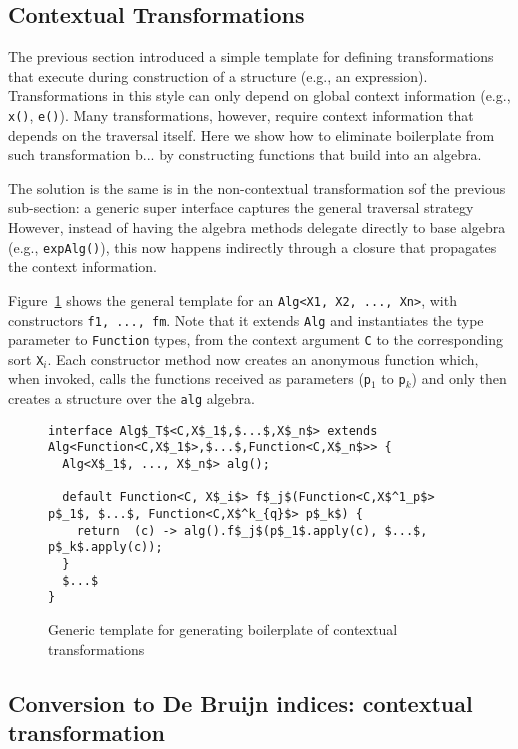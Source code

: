 \subsection{Contextual Transformations}\label{sec:contexttrans}

The previous section introduced a simple template for defining transformations that execute during construction of a structure (e.g., an expression).
Transformations in this style can only depend on global context information (e.g., \lstinline{x()}, \lstinline{e()}).
Many transformations, however, require context information that depends on the traversal itself.
Here we show how to eliminate boilerplate from such transformation b...  by constructing functions that build into an algebra.

The solution is the same is in the non-contextual transformation sof the previous sub-section: a generic super interface captures the general traversal strategy
However, instead of having the algebra methods delegate directly to base algebra (e.g., \lstinline{expAlg()}), this now happens indirectly through a closure that propagates the context information.

Figure~\ref{ctxTrafoTemplate} shows the general template for an \lstinline{Alg<X1, X2, ..., Xn>}, with constructors \lstinline{f1, ..., fm}.
Note that it extends \lstinline{Alg} and instantiates the type parameter to \lstinline{Function} types, from the context argument \lstinline{C} to the corresponding sort \lstinline{X}$_i$. 
Each constructor method now creates an anonymous function which, when invoked, calls the functions received as parameters (\lstinline{p}$_1$ to \lstinline{p}$_k$) and only then creates a structure over the \lstinline{alg} algebra.

\begin{figure}[t]
\begin{lstlisting}[mathescape=true]
interface Alg$_T$<C,X$_1$,$...$,X$_n$> extends Alg<Function<C,X$_1$>,$...$,Function<C,X$_n$>> {
  Alg<X$_1$, ..., X$_n$> alg();

  default Function<C, X$_i$> f$_j$(Function<C,X$^1_p$> p$_1$, $...$, Function<C,X$^k_{q}$> p$_k$) {
    return  (c) -> alg().f$_j$(p$_1$.apply(c), $...$, p$_k$.apply(c));
  }
  $...$
}
\end{lstlisting}
\caption{Generic template for generating boilerplate of contextual transformations}
\label{ctxTrafoTemplate}
\end{figure}

\subsection{Conversion to De Bruijn indices: contextual transformation}

